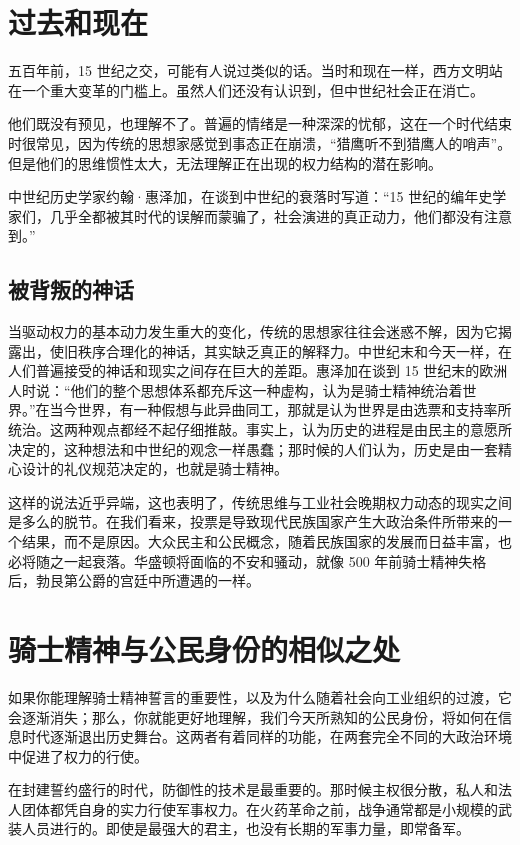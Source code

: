 \section{过去和现在}
五百年前，15 世纪之交，可能有人说过类似的话。当时和现在一样，西方文明站在一个重大变革的门槛上。虽然人们还没有认识到，但中世纪社会正在消亡。

他们既没有预见，也理解不了。普遍的情绪是一种深深的忧郁，这在一个时代结束时很常见，因为传统的思想家感觉到事态正在崩溃，“猎鹰听不到猎鹰人的哨声”。但是他们的思维惯性太大，无法理解正在出现的权力结构的潜在影响。

中世纪历史学家约翰·惠泽加，在谈到中世纪的衰落时写道：“15 世纪的编年史学家们，几乎全都被其时代的误解而蒙骗了，社会演进的真正动力，他们都没有注意到。”

\subsection{被背叛的神话}
当驱动权力的基本动力发生重大的变化，传统的思想家往往会迷惑不解，因为它揭露出，使旧秩序合理化的神话，其实缺乏真正的解释力。中世纪末和今天一样，在人们普遍接受的神话和现实之间存在巨大的差距。惠泽加在谈到 15 世纪末的欧洲人时说：“他们的整个思想体系都充斥这一种虚构，认为是骑士精神统治着世界。”在当今世界，有一种假想与此异曲同工，那就是认为世界是由选票和支持率所统治。这两种观点都经不起仔细推敲。事实上，认为历史的进程是由民主的意愿所决定的，这种想法和中世纪的观念一样愚蠢；那时候的人们认为，历史是由一套精心设计的礼仪规范决定的，也就是骑士精神。

这样的说法近乎异端，这也表明了，传统思维与工业社会晚期权力动态的现实之间是多么的脱节。在我们看来，投票是导致现代民族国家产生大政治条件所带来的一个结果，而不是原因。大众民主和公民概念，随着民族国家的发展而日益丰富，也必将随之一起衰落。华盛顿将面临的不安和骚动，就像 500 年前骑士精神失格后，勃艮第公爵的宫廷中所遭遇的一样。

\section{骑士精神与公民身份的相似之处}
如果你能理解骑士精神誓言的重要性，以及为什么随着社会向工业组织的过渡，它会逐渐消失；那么，你就能更好地理解，我们今天所熟知的公民身份，将如何在信息时代逐渐退出历史舞台。这两者有着同样的功能，在两套完全不同的大政治环境中促进了权力的行使。

在封建誓约盛行的时代，防御性的技术是最重要的。那时候主权很分散，私人和法人团体都凭自身的实力行使军事权力。在火药革命之前，战争通常都是小规模的武装人员进行的。即使是最强大的君主，也没有长期的军事力量，即常备军。

